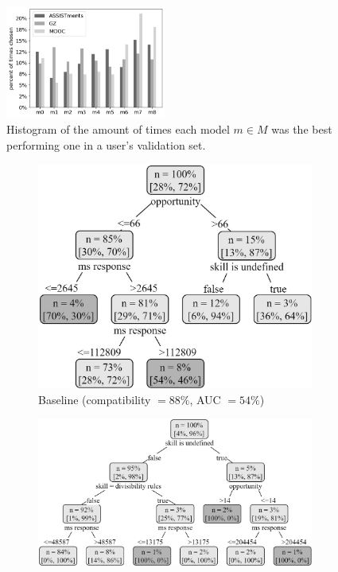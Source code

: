 \documentclass[letterpaper]{article} %
\theoremstyle{definition}
\begin{document}
\begin{figure}
\centering
\includegraphics[width=0.47\textwidth]{model_counts}
\caption{Histogram of the amount of times each model $m\in M$ was the best performing one in a user's validation set.}
\label{fig:model_counts}
\end{figure}

\begin{figure}[t]
\begin{subfigure}[b]{.4\textwidth}
\centering
\includegraphics[width=0.95\linewidth]{assistments_baseline}
\caption{Baseline (compatibility $=88\%$, AUC $=54\%$)}
\label{fig:assistments_baseline}
\end{subfigure}
\begin{subfigure}[b]{.6\textwidth}
\centering
\includegraphics[width=0.95\linewidth]{assistments_personalized}

\end{subfigure}
\end{figure}
\end{document}
